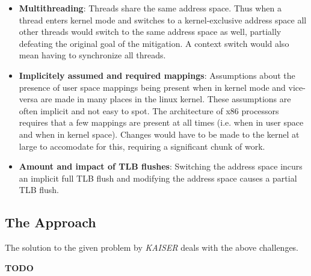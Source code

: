 \begin{itemize}
  \item{
    \textbf{Multithreading}:
    Threads share the same address space.
    Thus when a thread enters kernel mode and switches to a kernel-exclusive address space all other threads would switch to the same address space as well, partially defeating the original goal of the mitigation.
    A context switch would also mean having to synchronize all threads.
  }
  \item{
    \textbf{Implicitely assumed and required mappings}:
    Assumptions about the presence of user space mappings being present when in kernel mode and vice-versa are made in many places in the linux kernel.
    These assumptions are often implicit and not easy to spot.
    The architecture of x86 processors requires that a few mappings are present at all times (i.e. when in user space and when in kernel space).
    Changes would have to be made to the kernel at large to accomodate for this, requiring a significant chunk of work.
  }
  \item{
    \textbf{Amount and impact of TLB flushes}:
    Switching the address space incurs an implicit full TLB flush and modifying the address space causes a partial TLB flush. \cite{the-ginormous-intel-manual-volume-3}
  }
\end{itemize}

\subsection{The Approach}

The solution to the given problem by \textit{KAISER} deals with the above challenges.



\textbf{TODO}

